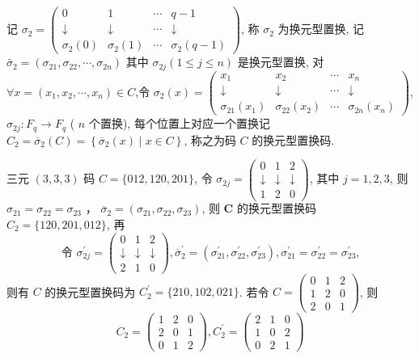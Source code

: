 \begin{definition}[ 换元型置换码]
 记 $ \sigma_{2}=\left(\begin{array}{cccc}0 & 1 & \cdots & q-1 \\ \downarrow & \downarrow & \cdots & \downarrow \\ \sigma_{2}(0) & \sigma_{2}(1) & \cdots & \sigma_{2}(q-1)\end{array}\right) $, 称 $ \sigma_{2} $ 为换元型置换, 记 $ \bar{\sigma}_{2}=\left(\sigma_{21}, \sigma_{22}, \cdots, \sigma_{2 n}\right) $ 其中 $ \sigma_{2 j}(1 \leq j \leq n) $ 是换元型置换, 对 $ \forall x=\left(x_{1}, x_{2}, \cdots, x_{n}\right) \in C $,令 $ \sigma_{2}(x)=\left(\begin{array}{cccc}x_{1} & x_{2} & \cdots & x_{n} \\ \downarrow & \downarrow & \cdots & \downarrow \\ \sigma_{21}\left(x_{1}\right) & \sigma_{22}\left(x_{2}\right) & \cdots & \sigma_{2 n}\left(x_{n}\right)\end{array}\right) $,  $ \sigma_{2 j}: F_{q} \longrightarrow F_{q} $
( $ n $ 个置换), 每个位置上对应一个置换记 $ C_{2}=\overline{\sigma}_{2}(C)=\left\{\overline{\sigma}_{2}(x) \mid x \in C\right\} $, 称之为码 $ C $ 的换元型置换码.
\end{definition}

\begin{example}
三元 $ (3,3,3) $ 码 $ C=\{012,120,201\} $,
令 $ \sigma_{2 j}=\left(\begin{array}{lll}0 & 1 & 2 \\ \downarrow & \downarrow & \downarrow \\ 1 & 2 & 0\end{array}\right) $, 其中 $ j=1,2,3 $, 则 $ \sigma_{21}=\sigma_{22}=\sigma_{23} $ ， $ \overline{\sigma}_{2}=\left(\sigma_{21}, \sigma_{22}, \sigma_{23}\right) $, 则 $ \boldsymbol{C} $ 的换元型置换码 $ C_{2}=\{120,201,012\} $, 再
$$
\text { 令 } \sigma_{2 j}^{\prime}=\left(\begin{array}{ccc}
0 & 1 & 2 \\
\downarrow & \downarrow & \downarrow \\
2 & 1 & 0
\end{array}\right), \overline{\sigma}_{2}^{\prime}=\left(\sigma_{21}^{\prime}, \sigma_{22}^{\prime}, \sigma_{23}^{\prime}\right), \sigma_{21}^{\prime}=\sigma_{22}^{\prime}=\sigma_{23}^{\prime} \text {, }
$$
则有 $ C $ 的换元型置换码为 $ C_{2}^{\prime}=\{210,102,021\} $. 若令 $ C= \left(\begin{array}{lll}
0 & 1 & 2 \\
1 & 2 & 0 \\
2 & 0 & 1
\end{array}\right)$, 则
$$
C_{2}=\left(\begin{array}{lll}
1 & 2 & 0 \\
2 & 0 & 1 \\
0 & 1 & 2
\end{array}\right), C_{2}^{\prime}=\left(\begin{array}{lll}
2 & 1 & 0 \\
1 & 0 & 2 \\
0 & 2 & 1
\end{array}\right)
$$
\end{example}

